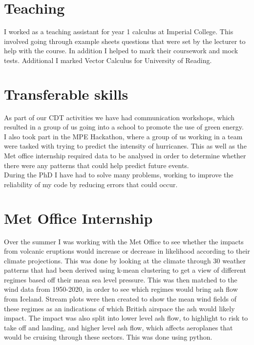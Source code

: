 \documentclass[12pt]{article}
\begin{document}
\section{Teaching}
I worked as a teaching assistant for year 1 calculus at Imperial College. This involved going through example sheets questions that were set by the lecturer to help with the course. In addition I helped to mark their coursework and mock tests. Additional I marked Vector Calculus for University of Reading.
\section{Transferable skills}
As part of our CDT activities we have had communication workshops, which resulted in a group of us going into a school to promote the use of green energy.\\
I also took part in the MPE Hackathon, where a group of us working in a team were tasked with trying to predict the intensity of hurricanes. This as well as the Met office internship required data to be analysed in order to determine whether there were any patterns that could help predict future events.\\
During the PhD I have had to solve many problems, working to improve the reliability of my code by reducing errors that could occur.

\section{Met Office Internship}
Over the summer I was working with the Met Office to see whether the impacts from volcanic eruptions would increase or decrease in likelihood according to their climate projections. This was done by looking at the climate through 30 weather patterns that had been derived using k-mean clustering to get a view of different regimes based off their mean sea level pressure. This was then matched to the wind data from 1950-2020, in order to see which regimes would bring ash flow from Iceland. Stream plots were then created to show the mean wind fields of these regimes as an indications of which British airspace the ash would likely impact. The impact was also split into lower level ash flow, to highlight to risk to take off and landing, and higher level ash flow, which affects aeroplanes that would be cruising through these sectors. This was done using python.
\end{document}
